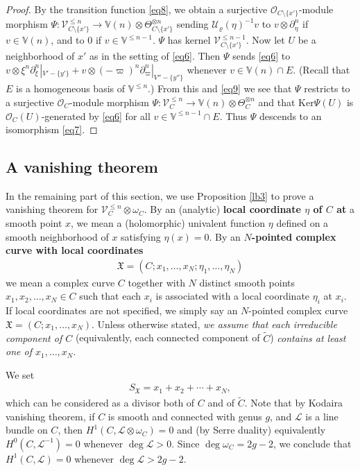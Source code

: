 \documentclass[11pt,b5paper,notitlepage]{article}
\theoremstyle{definition}
\theoremstyle{plain}
\newcommand{\fk}{\mathfrak}
\newcommand{\mc}{\mathcal}
\newcommand{\wtd}{\widetilde}
\newcommand{\scr}{\mathscr}
\newcommand{\SX}{S_{\fk X}}
\newcommand{\Vbb}{\mathbb V}
\newcommand{\Ker}{\mathrm{Ker}}
\numberwithin{equation}{section}
\begin{document}
\begin{proof}
By the transition function \eqref{eq8}, we obtain a surjective $\scr O_{C\setminus\{x'\}}$-module morphism $\Psi:\scr V_{C\setminus\{x'\}}^{\leq n}\rightarrow\Vbb(n)\otimes\Theta_{C\setminus\{x'\}}^{\otimes n}$ sending $\mc U_\varrho(\eta)^{-1}v$ to  $v\otimes \partial_\eta^n$ if $v\in\Vbb(n)$, and to $0$ if $v\in\Vbb^{\leq n-1}$. $\Psi$ has kernel $\scr V_{C\setminus\{x'\}}^{\leq n-1}$. Now let $U$ be a neighborhood of $x'$ as in the setting of \eqref{eq6}. Then $\Psi$ sends \eqref{eq6} to $v\otimes \xi^n\partial_\xi^n|_{V'-\{y'\}}+v\otimes(-\varpi)^n\partial_\varpi^n|_{V''-\{y''\}}$ whenever $v\in\Vbb(n)\cap E$. (Recall that $E$ is a homogeneous basis of $\Vbb^{\leq n}$.) From this and \eqref{eq9} we see that $\Psi$ restricts to a surjective $\scr O_C$-module morphism $\Psi:\scr V_C^{\leq n}\rightarrow\Vbb(n)\otimes\Theta_C^{\otimes n}$ and that $\Ker\Psi(U)$ is $\scr O_C(U)$-generated by  \eqref{eq6} for all $v\in \Vbb^{\leq n-1}\cap E$. Thus $\Psi$ descends to an isomorphism \eqref{eq7}.
\end{proof}


\subsection*{A vanishing theorem}



In the remaining part of this section, we use Proposition \ref{lb3} to prove a vanishing theorem for $\scr V_C^{\leq n}\otimes\omega_C$. By an (analytic) \textbf{local coordinate $\eta$ of $C$ at} a smooth point $x$, we mean  a (holomorphic) univalent function $\eta$ defined on a smooth neighborhood of $x$ satisfying $\eta(x)=0$. By an \textbf{$N$-pointed complex curve with local coordinates}
\begin{align*}
\fk X=(C;x_1,\dots,x_N;\eta_1,\dots,\eta_N)
\end{align*}
we mean a complex curve $C$ together with $N$ distinct smooth points $x_1,x_2,\dots,x_N\in C$ such that each $x_i$ is associated with a local coordinate $\eta_i$ at $x_i$. If local coordinates are not specified, we simply say an $N$-pointed complex curve $\fk X=(C;x_1,\dots,x_N)$. Unless otherwise stated, \emph{we assume that each irreducible component of $C$} (equivalently, each connected component of $\wtd C$) \emph{contains at least one of $x_1,\dots,x_N$}. 

We set \index{SX@$\SX,\SX(b)$}
\begin{align*}
\SX=x_1+x_2+\cdots+x_N,
\end{align*}
which can be considered as a divisor both of $C$ and of $\wtd C$. Note that by Kodaira vanishing theorem, if $C$ is smooth and connected with genus $g$, and $\scr L$ is a line bundle on $C$, then $H^1(C,\scr L\otimes\omega_C)=0$ and (by Serre duality) equivalently  $H^0(C,\scr L^{-1})=0$ whenever $\deg\scr L>0$. Since $\deg\omega_C=2g-2$, we conclude that $H^1(C,\scr L)=0$ whenever $\deg\scr L>2g-2$.
\end{document}
